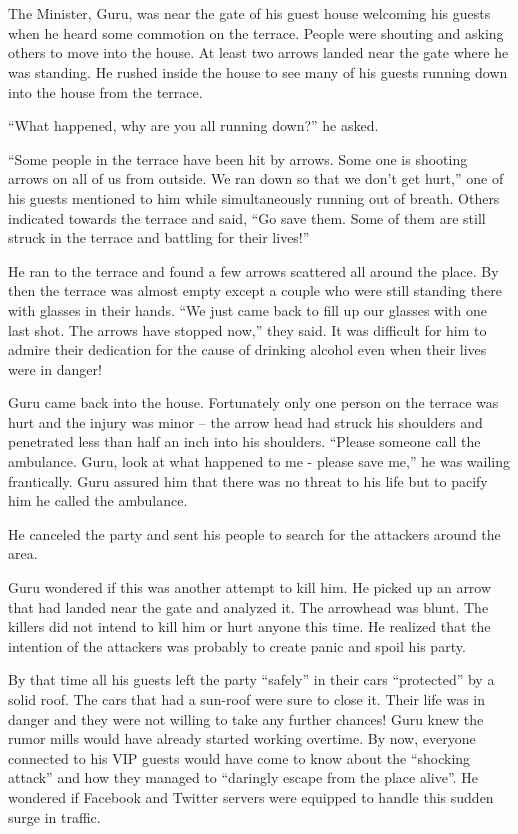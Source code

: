 \chapter{}

The Minister, Guru, was near the gate of his guest house welcoming his guests
when he heard some commotion on the terrace. People were shouting and asking
others to move into the house. At least two arrows landed near the gate where he
was standing. He rushed inside the house to see many of his guests running down
into the house from the terrace.

“What happened, why are you all running down?” he asked.

“Some people in the terrace have been hit by arrows. Some one is shooting arrows
on all of us from outside. We ran down so that we don't get hurt,” one of his
guests mentioned to him while simultaneously running out of breath. Others
indicated towards the terrace and said, “Go save them. Some of them are still
struck in the terrace and battling for their lives!”

He ran to the terrace and found a few arrows scattered all around the place. By
then the terrace was almost empty except a couple who were still standing there
with glasses in their hands. “We just came back to fill up our glasses with one
last shot. The arrows have stopped now,” they said. It was difficult for him to
admire their dedication for the cause of drinking alcohol even when their lives
were in danger!

Guru came back into the house. Fortunately only one person on the terrace was
hurt and the injury was minor – the arrow head had struck his shoulders and
penetrated less than half an inch into his shoulders. “Please someone call the
ambulance. Guru, look at what happened to me - please save me,” he was wailing
frantically. Guru assured him that there was no threat to his life but to pacify
him he called the ambulance.

He canceled the party and sent his people to search for the attackers around the
area.

Guru wondered if this was another attempt to kill him. He picked up an arrow
that had landed near the gate and analyzed it. The arrowhead was blunt. The
killers did not intend to kill him or hurt anyone this time. He realized that
the intention of the attackers was probably to create panic and spoil his party.

By that time all his guests left the party “safely” in their cars “protected” by
a solid roof. The cars that had a sun-roof were sure to close it. Their life was
in danger and they were not willing to take any further chances! Guru knew the
rumor mills would have already started working overtime. By now, everyone
connected to his VIP guests would have come to know about the “shocking attack”
and how they managed to “daringly escape from the place alive”. He wondered if
Facebook and Twitter servers were equipped to handle this sudden surge in
traffic.


